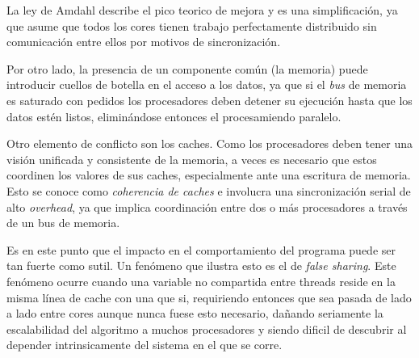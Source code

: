 La ley de Amdahl describe el pico teorico de mejora y es una simplificaci\'on, ya que asume que todos los cores tienen
trabajo perfectamente distribuido sin comunicaci\'on entre ellos por motivos de sincronizaci\'on.

Por otro lado, la presencia de un componente com\'un (la memoria) puede introducir cuellos de botella en el acceso a los
datos, ya que si el \textit{bus} de memoria es saturado con pedidos los procesadores deben detener su ejecuci\'on hasta que
los datos est\'en listos, elimin\'andose entonces el procesamiendo paralelo.

Otro elemento de conflicto son los caches. Como los procesadores deben tener una visi\'on unificada y consistente de la
memoria, a veces es necesario que estos coordinen los valores de sus caches, especialmente ante una escritura de memoria.
Esto se conoce como \textit{coherencia de caches} e involucra una sincronizaci\'on serial de alto \textit{overhead}, ya
que implica coordinaci\'on entre dos o m\'as procesadores a trav\'es de un bus de memoria.

Es en este punto que el impacto en el comportamiento del programa puede ser tan fuerte como sutil. Un fen\'omeno que
ilustra esto es el de \textit{false sharing}. Este fen\'omeno ocurre cuando una variable no compartida entre threads
reside en la misma l\'inea de cache con una que si, requiriendo entonces que sea pasada de lado a lado entre cores aunque
nunca fuese esto necesario, da\~nando seriamente la escalabilidad del algoritmo a muchos procesadores y siendo
dificil de descubrir al depender intrinsicamente del sistema en el que se corre.
